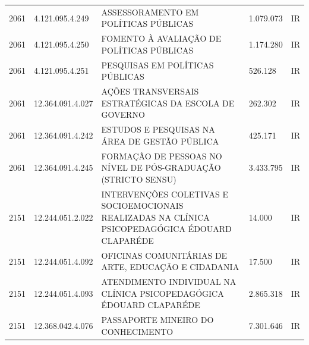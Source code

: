 \documentclass{article}
\begin{document}
\begin{longtable}[c]{m{1cm}|m{2cm}|m{10cm}|m{2cm}|m{1cm}}
\multicolumn{1}{C{1cm}|}{2061} & \multicolumn{1}{C{2cm}|}{4.121.095.4.249} & \multicolumn{1}{L{10cm}|}{ASSESSORAMENTO EM POLÍTICAS PÚBLICAS} & \multicolumn{1}{R{2cm}|}{1.079.073} & \multicolumn{1}{C{1cm}}{IR} \\
\multicolumn{1}{C{1cm}|}{2061} & \multicolumn{1}{C{2cm}|}{4.121.095.4.250} & \multicolumn{1}{L{10cm}|}{FOMENTO À AVALIAÇÃO DE POLÍTICAS PÚBLICAS} & \multicolumn{1}{R{2cm}|}{1.174.280} & \multicolumn{1}{C{1cm}}{IR} \\
\multicolumn{1}{C{1cm}|}{2061} & \multicolumn{1}{C{2cm}|}{4.121.095.4.251} & \multicolumn{1}{L{10cm}|}{PESQUISAS EM POLÍTICAS PÚBLICAS} & \multicolumn{1}{R{2cm}|}{526.128} & \multicolumn{1}{C{1cm}}{IR} \\
\multicolumn{1}{C{1cm}|}{2061} & \multicolumn{1}{C{2cm}|}{12.364.091.4.027} & \multicolumn{1}{L{10cm}|}{AÇÕES TRANSVERSAIS ESTRATÉGICAS DA ESCOLA DE GOVERNO} & \multicolumn{1}{R{2cm}|}{262.302} & \multicolumn{1}{C{1cm}}{IR} \\
\multicolumn{1}{C{1cm}|}{2061} & \multicolumn{1}{C{2cm}|}{12.364.091.4.242} & \multicolumn{1}{L{10cm}|}{ESTUDOS E PESQUISAS NA ÁREA DE GESTÃO PÚBLICA} & \multicolumn{1}{R{2cm}|}{425.171} & \multicolumn{1}{C{1cm}}{IR} \\
\multicolumn{1}{C{1cm}|}{2061} & \multicolumn{1}{C{2cm}|}{12.364.091.4.245} & \multicolumn{1}{L{10cm}|}{FORMAÇÃO DE PESSOAS NO NÍVEL DE PÓS-GRADUAÇÃO (STRICTO SENSU)} & \multicolumn{1}{R{2cm}|}{3.433.795} & \multicolumn{1}{C{1cm}}{IR} \\
\multicolumn{1}{C{1cm}|}{2151} & \multicolumn{1}{C{2cm}|}{12.244.051.2.022} & \multicolumn{1}{L{10cm}|}{INTERVENÇÕES COLETIVAS E SOCIOEMOCIONAIS REALIZADAS NA CLÍNICA PSICOPEDAGÓGICA ÉDOUARD CLAPARÉDE} & \multicolumn{1}{R{2cm}|}{14.000} & \multicolumn{1}{C{1cm}}{IR} \\
\multicolumn{1}{C{1cm}|}{2151} & \multicolumn{1}{C{2cm}|}{12.244.051.4.092} & \multicolumn{1}{L{10cm}|}{OFICINAS COMUNITÁRIAS DE ARTE, EDUCAÇÃO E CIDADANIA} & \multicolumn{1}{R{2cm}|}{17.500} & \multicolumn{1}{C{1cm}}{IR} \\
\multicolumn{1}{C{1cm}|}{2151} & \multicolumn{1}{C{2cm}|}{12.244.051.4.093} & \multicolumn{1}{L{10cm}|}{ATENDIMENTO INDIVIDUAL NA CLÍNICA PSICOPEDAGÓGICA ÉDOUARD CLAPARÉDE} & \multicolumn{1}{R{2cm}|}{2.865.318} & \multicolumn{1}{C{1cm}}{IR} \\
\multicolumn{1}{C{1cm}|}{2151} & \multicolumn{1}{C{2cm}|}{12.368.042.4.076} & \multicolumn{1}{L{10cm}|}{PASSAPORTE MINEIRO DO CONHECIMENTO} & \multicolumn{1}{R{2cm}|}{7.301.646} & \multicolumn{1}{C{1cm}}{IR} \\

\end{longtable}
\end{document}
